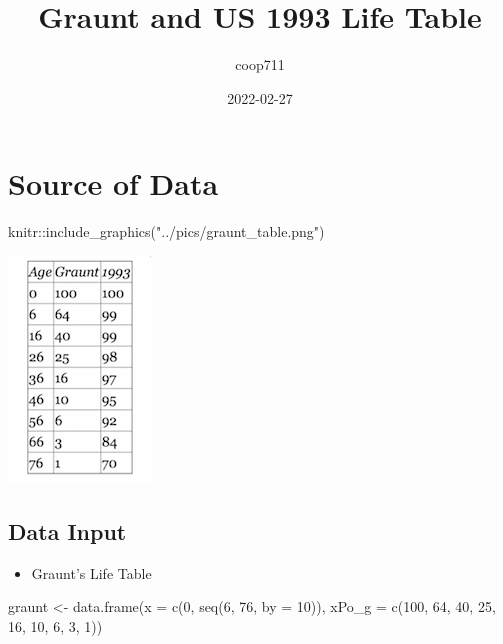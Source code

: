 \documentclass[
]{article}
\title{Graunt and US 1993 Life Table}
\author{coop711}
\date{2022-02-27}
\newenvironment{Shaded}{\begin{snugshade}}{\end{snugshade}}
\newcommand{\AttributeTok}[1]{\textcolor[rgb]{0.77,0.63,0.00}{#1}}
\newcommand{\DecValTok}[1]{\textcolor[rgb]{0.00,0.00,0.81}{#1}}
\newcommand{\FunctionTok}[1]{\textcolor[rgb]{0.00,0.00,0.00}{#1}}
\newcommand{\NormalTok}[1]{#1}
\newcommand{\OtherTok}[1]{\textcolor[rgb]{0.56,0.35,0.01}{#1}}
\newcommand{\SpecialCharTok}[1]{\textcolor[rgb]{0.00,0.00,0.00}{#1}}
\newcommand{\StringTok}[1]{\textcolor[rgb]{0.31,0.60,0.02}{#1}}
\providecommand{\tightlist}{%
  \setlength{\itemsep}{0pt}\setlength{\parskip}{0pt}}
\begin{document}
\maketitle

\hypertarget{source-of-data}{%
\section{Source of Data}\label{source-of-data}}

\begin{Shaded}
\begin{Highlighting}[]
\NormalTok{knitr}\SpecialCharTok{::}\FunctionTok{include\_graphics}\NormalTok{(}\StringTok{"../pics/graunt\_table.png"}\NormalTok{)}
\end{Highlighting}
\end{Shaded}

\begin{flushleft}\includegraphics[width=0.25\linewidth]{../pics/graunt_table} \end{flushleft}

\hypertarget{data-input}{%
\subsection{Data Input}\label{data-input}}

\begin{itemize}
\tightlist
\item
  Graunt's Life Table
\end{itemize}

\begin{Shaded}
\begin{Highlighting}[]
\NormalTok{graunt }\OtherTok{\textless{}{-}} \FunctionTok{data.frame}\NormalTok{(}\AttributeTok{x =} \FunctionTok{c}\NormalTok{(}\DecValTok{0}\NormalTok{, }\FunctionTok{seq}\NormalTok{(}\DecValTok{6}\NormalTok{, }\DecValTok{76}\NormalTok{, }\AttributeTok{by =} \DecValTok{10}\NormalTok{)), }
                     \AttributeTok{xPo\_g =} \FunctionTok{c}\NormalTok{(}\DecValTok{100}\NormalTok{, }\DecValTok{64}\NormalTok{, }\DecValTok{40}\NormalTok{, }\DecValTok{25}\NormalTok{, }\DecValTok{16}\NormalTok{, }\DecValTok{10}\NormalTok{, }\DecValTok{6}\NormalTok{, }\DecValTok{3}\NormalTok{, }\DecValTok{1}\NormalTok{))}
\end{Highlighting}
\end{Shaded}
\end{document}
